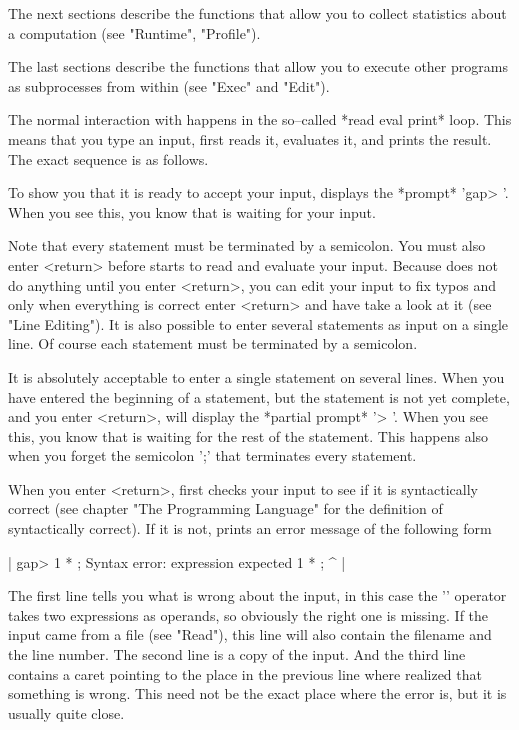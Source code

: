 The  next  sections describe  the  functions that  allow you to   collect
statistics about a computation (see "Runtime", "Profile").

The last sections describe the functions that allow  you to execute other
programs as subprocesses from within {\GAP} (see "Exec" and "Edit").

%
%
%
%
%
%

The normal  interaction with {\GAP} happens in  the so--called *read eval
print* loop.  This means that you type an input, {\GAP}  first reads  it,
evaluates it, and prints the result.  The exact sequence is as follows.

To show you that  it is ready  to accept your  input, {\GAP} displays the
*prompt* 'gap> '.  When you see this, you know that {\GAP} is waiting for
your input.

Note that every statement must be terminated by a  semicolon.   You  must
also enter <return> before {\GAP} starts to read and evaluate your input.
Because  {\GAP} does not  do anything until  you enter  <return>, you can
edit  your input to fix typos and only when  everything is  correct enter
<return> and have {\GAP}  take a  look at it (see "Line Editing").  It is
also possible to enter several statements as  input on a single line.  Of
course each statement must be terminated by a semicolon.

It is absolutely acceptable to enter a single statement on several lines.
When you have entered the beginning of a  statement, but the statement is
not  yet  complete, and  you  enter  <return>, {\GAP}  will  display  the
*partial prompt*   '> '.   When you see   this, you  know that {\GAP}  is
waiting for the rest of the statement.  This happens also when you forget
the semicolon ';' that terminates every {\GAP} statement.

When you enter <return>, {\GAP} first checks your  input to see  if it is
syntactically  correct (see chapter  "The Programming  Language"  for the
definition  of syntactically correct).   If it is  not, {\GAP}  prints an
error message of the following form

|    gap> 1 * ;
    Syntax error: expression expected
    1 * ;
        ^ |

The first line tells you what is wrong about  the input, in this case the
'\*' operator takes  two expressions as  operands, so obviously the right
one is missing.  If the  input came from a  file (see "Read"), this  line
will also contain the filename and the line number.  The second line is a
copy of the input.  And the third  line contains a  caret pointing to the
place in the previous line where {\GAP} realized that something is wrong.
This need not be  the exact place where  the error is,  but it is usually
quite close.


